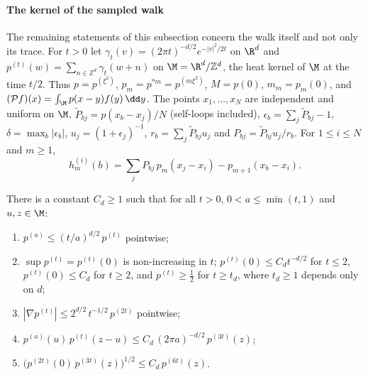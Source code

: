 

\paragraph{The kernel of the sampled walk} The remaining statements of this subsection concern the walk itself and not only its trace. For $t>0$ let $\gamma_t(v)=(2\pi t)^{-d/2}e^{-|v|^2/2t}$ on $\R^d$ and $p^{(t)}(w)=\sum_{n\in\mathbb Z^d}\gamma_t(w+n)$ on $\M=\R^d/\mathbb Z^d$, the heat kernel of $\M$ at the time $t/2$. Thus $p=p^{(\xi^2)}$, $p_m=p^{*m}=p^{(m\xi^2)}$, $M=p(0)$, $m_m=p_m(0)$, and $(\mathcal Pf)(x)=\int_\M p(x-y)f(y)\,\dd y$. The points $x_1,\dots,x_N$ are independent and uniform on $\M$, $\tilde P_{bj}=p(x_b-x_j)/N$ (self-loops included), $\epsilon_b=\sum_j\tilde P_{bj}-1$, $\delta=\max_b|\epsilon_b|$, $u_j=(1+\epsilon_j)^{-1}$, $r_b=\sum_j\tilde P_{bj}u_j$ and $P_{bj}=\tilde P_{bj}u_j/r_b$. For $1\le i\le N$ and $m\ge1$,
\[
h^{(i)}_m(b)=\sum_jP_{bj}\,p_m(x_j-x_i)-p_{m+1}(x_b-x_i).
\]

\begin{lemma}\label{lem:pgauss}
There is a constant $C_d\ge1$ such that for all $t>0$, $0<a\le\min(t,1)$ and $u,z\in\M$:
\begin{enumerate}[label=\textup{(P\arabic*)}]
\item $p^{(a)}\le(t/a)^{d/2}\,p^{(t)}$ pointwise;
\item $\sup p^{(t)}=p^{(t)}(0)$ is non-increasing in $t$; $p^{(t)}(0)\le C_dt^{-d/2}$ for $t\le2$, $p^{(t)}(0)\le C_d$ for $t\ge2$, and $p^{(t)}\ge\frac12$ for $t\ge t_d$, where $t_d\ge1$ depends only on $d$;
\item $|\nabla p^{(t)}|\le2^{d/2}\,t^{-1/2}\,p^{(2t)}$ pointwise;
\item $p^{(a)}(u)\,p^{(t)}(z-u)\le C_d\,(2\pi a)^{-d/2}\,p^{(3t)}(z)$;
\item $\big(p^{(2t)}(0)\,p^{(3t)}(z)\big)^{1/2}\le C_d\,p^{(6t)}(z)$.
\end{enumerate}
\end{lemma}

